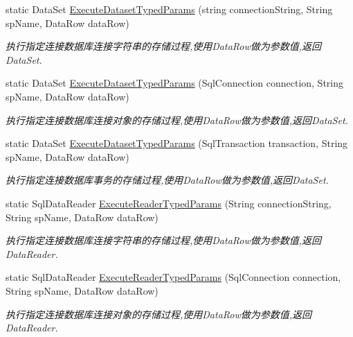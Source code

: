 \begin{DoxyCompactItemize}
static Data\-Set \hyperlink{class_x_c_l_net_tools_1_1_data_base_1_1_m_s_s_q_l_1_1_sql_helper_a7ca275b0a4c125a68d9129118a7fa2e4}{Execute\-Dataset\-Typed\-Params} (string connection\-String, String sp\-Name, Data\-Row data\-Row)
\begin{DoxyCompactList}\small\item\em 执行指定连接数据库连接字符串的存储过程,使用\-Data\-Row做为参数值,返回\-Data\-Set. \end{DoxyCompactList}\item 
static Data\-Set \hyperlink{class_x_c_l_net_tools_1_1_data_base_1_1_m_s_s_q_l_1_1_sql_helper_a99ad32d46796d105b83d64d1d4410adb}{Execute\-Dataset\-Typed\-Params} (Sql\-Connection connection, String sp\-Name, Data\-Row data\-Row)
\begin{DoxyCompactList}\small\item\em 执行指定连接数据库连接对象的存储过程,使用\-Data\-Row做为参数值,返回\-Data\-Set. \end{DoxyCompactList}\item 
static Data\-Set \hyperlink{class_x_c_l_net_tools_1_1_data_base_1_1_m_s_s_q_l_1_1_sql_helper_a20c701f5bf5d0446f1b0e3abca2fdaa3}{Execute\-Dataset\-Typed\-Params} (Sql\-Transaction transaction, String sp\-Name, Data\-Row data\-Row)
\begin{DoxyCompactList}\small\item\em 执行指定连接数据库事务的存储过程,使用\-Data\-Row做为参数值,返回\-Data\-Set. \end{DoxyCompactList}\item 
static Sql\-Data\-Reader \hyperlink{class_x_c_l_net_tools_1_1_data_base_1_1_m_s_s_q_l_1_1_sql_helper_a9d1fe3c152aef1502290da70a2816191}{Execute\-Reader\-Typed\-Params} (String connection\-String, String sp\-Name, Data\-Row data\-Row)
\begin{DoxyCompactList}\small\item\em 执行指定连接数据库连接字符串的存储过程,使用\-Data\-Row做为参数值,返回\-Data\-Reader. \end{DoxyCompactList}\item 
static Sql\-Data\-Reader \hyperlink{class_x_c_l_net_tools_1_1_data_base_1_1_m_s_s_q_l_1_1_sql_helper_aabf34a05a161a10559fcb6cc1e82e462}{Execute\-Reader\-Typed\-Params} (Sql\-Connection connection, String sp\-Name, Data\-Row data\-Row)
\begin{DoxyCompactList}\small\item\em 执行指定连接数据库连接对象的存储过程,使用\-Data\-Row做为参数值,返回\-Data\-Reader. \end{DoxyCompactList}\item 

\end{DoxyCompactItemize}
